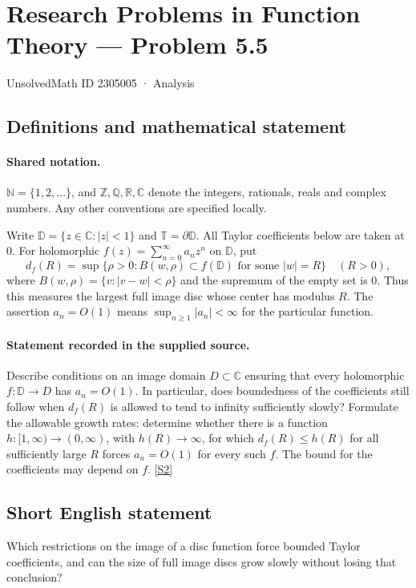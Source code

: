 \documentclass[11pt]{article}
\newcommand{\sref}[2]{\hyperlink{source:#1:#2}{[S#2]}}
\begin{document}
\setcounter{section}{2305004}
\section{Research Problems in Function Theory — Problem 5.5}\label{2305005}
{\small\sffamily UnsolvedMath ID 2305005 · Analysis}
\subsection{Definitions and mathematical statement}

\paragraph{Shared notation.}$\mathbb N=\{1,2,\ldots\}$, and $\mathbb Z,\mathbb Q,\mathbb R,\mathbb C$ denote the integers, rationals, reals and complex numbers. Any other conventions are specified locally.


Write $\mathbb D=\{z\in\mathbb C:|z|<1\}$ and $\mathbb T=\partial\mathbb D$. All Taylor coefficients below are taken at $0$. For holomorphic $f(z)=\sum_{n=0}^\infty a_nz^n$ on $\mathbb D$, put
\[d_f(R)=\sup\{\rho>0:B(w,\rho)\subset f(\mathbb D)\text{ for some }|w|=R\}\quad(R>0),\]
where $B(w,\rho)=\{v:|v-w|<\rho\}$ and the supremum of the empty set is $0$. Thus this measures the largest full image disc whose center has modulus $R$. The assertion $a_n=O(1)$ means $\sup_{n\ge1}|a_n|<\infty$ for the particular function.
\paragraph{Statement recorded in the supplied source.}
Describe conditions on an image domain $D\subset\mathbb C$ ensuring that every holomorphic $f:\mathbb D\to D$ has $a_n=O(1)$. In particular, does boundedness of the coefficients still follow when $d_f(R)$ is allowed to tend to infinity sufficiently slowly? Formulate the allowable growth rates: determine whether there is a function $h:[1,\infty)\to(0,\infty)$, with $h(R)\to\infty$, for which $d_f(R)\le h(R)$ for all sufficiently large $R$ forces $a_n=O(1)$ for every such $f$. The bound for the coefficients may depend on $f$. \sref{2305005}{2}
\subsection{Short English statement}
Which restrictions on the image of a disc function force bounded Taylor coefficients, and can the size of full image discs grow slowly without losing that conclusion?
\end{document}
